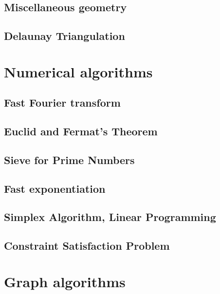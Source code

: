 \subsection{Miscellaneous geometry}
\raggedbottom
\hrulefill
\subsection{Delaunay Triangulation}
\raggedbottom
\hrulefill

\section{Numerical algorithms}
\subsection{Fast Fourier transform}
\raggedbottom
\hrulefill
\subsection{Euclid and Fermat's Theorem}
\raggedbottom
\hrulefill
\subsection{Sieve for Prime Numbers}
\raggedbottom
\hrulefill
\subsection{Fast exponentiation}
\raggedbottom
\hrulefill
\subsection{Simplex Algorithm, Linear Programming}
\raggedbottom
\hrulefill
\subsection{Constraint Satisfaction Problem}
\raggedbottom
\hrulefill

\section{Graph algorithms}

